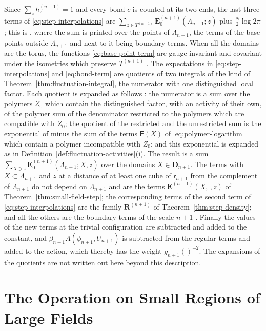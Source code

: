 \documentclass[11pt]{preprint}
\makeatletter
\newcommand*{\bigcdot}{}%
\DeclareRobustCommand*{\bigcdot}{%
	\mathbin{\mathpalette\bigcdot@{}}%
}
\newcommand*{\bigcdot@scalefactor}{.7}
\newcommand*{\bigcdot@widthfactor}{1.15}
\newcommand*{\bigcdot@}[2]{%
	\sbox0{$#1\vcenter{}$}%
	\sbox2{$#1\cdot\m@th$}%
	\hbox to \bigcdot@widthfactor\wd2{%
		\hss
		\raise\ht0\hbox{%
			\scalebox{\bigcdot@scalefactor}{%
				\lower\ht0\hbox{$#1\bullet\m@th$}%
			}%
		}%
		\hss
	}%
}
\numberwithin{equation}{section}
\makeatother
\begin{document}
Since $\sum_zh^{(n+1)}_z = 1$ and every bond $c$ is counted at its two ends, the last three terms of \eqref{eq:step-interpolations} are $\sum_{z \in T^{(n+1)}}\mathbf E^{(n+1)}_0(\Lambda_{n+1}; z)$ plus $\frac{N}{2}\log 2\pi$; this is \cite[(3.37)--(3.42)]{BalabanCRE}, where the sum is printed over the points of $\Lambda_{n+1}$, the terms of the base points outside $\Lambda_{n+1}$ and next to it being boundary terms. When all the domains are the torus, the functions \eqref{eq:base-point-term} are gauge invariant and covariant under the isometries which preserve $T^{(n+1)}$ \cite[(3.39)]{BalabanCRE}. The expectations in \eqref{eq:step-interpolations} and \eqref{eq:bond-term} are quotients of two integrals of the kind of Theorem~\ref{thm:fluctuation-integral}, the numerator with one distinguished local factor. Each quotient is expanded as follows \cite[(3.44)--(3.47)]{BalabanCRE}: the numerator is a sum over the polymers $Z_0$ which contain the distinguished factor, with an activity of their own, of the polymer sum of the denominator restricted to the polymers which are compatible with $Z_0$; the quotient of the restricted and the unrestricted sum is the exponential of minus the sum of the terms $\mathsf E(X)$ of \eqref{eq:polymer-logarithm} which contain a polymer incompatible with $Z_0$; and this exponential is expanded as in Definition~\ref{def:fluctuation-activities}(i). The result is a sum $\sum_{X \ni z}\mathbf E^{(n+1)}_0(\Lambda_{n+1}; X, z)$ over the domains $X \in \mathbf D_{n+1}$. The terms with $X \subset \Lambda_{n+1}$ and $z$ at a distance of at least one cube of $\mathsf r_{n+1}$ from the complement of $\Lambda_{n+1}$ do not depend on $\Lambda_{n+1}$ and are the terms $\mathbf E^{(n+1)}(X, \bigcdot\,, z)$ of Theorem~\ref{thm:small-field-step}; the corresponding terms of the second term of \eqref{eq:step-interpolations} are the family $\mathbf R^{(n+1)}$ of Theorem~\ref{thm:step-density}; and all the others are the boundary terms of the scale $n + 1$ \cite[pp.~278--279]{BalabanCRE}. Finally the values of the new terms at the trivial configuration are subtracted and added to the constant, and $\beta_{n+1}A(\phi_{n+1}, U_{n+1})$ is subtracted from the regular terms and added to the action, which thereby has the weight $g_{n+1}(\bigcdot)^{-2}$. The expansions of the quotients are not written out here beyond this description.

\section{The Operation on Small Regions of Large Fields}\label{sec:r-operation}
\end{document}
